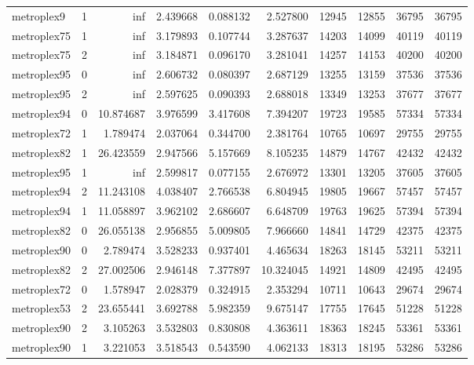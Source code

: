 \begin{longtable}{|l|r|r|r|r|r|r|r|r|r|}
metroplex9 & 1 & inf & 2.439668 & 0.088132 & 2.527800 & 12945 & 12855 & 36795 & 36795 \\
metroplex75 & 1 & inf & 3.179893 & 0.107744 & 3.287637 & 14203 & 14099 & 40119 & 40119 \\
metroplex75 & 2 & inf & 3.184871 & 0.096170 & 3.281041 & 14257 & 14153 & 40200 & 40200 \\
metroplex95 & 0 & inf & 2.606732 & 0.080397 & 2.687129 & 13255 & 13159 & 37536 & 37536 \\
metroplex95 & 2 & inf & 2.597625 & 0.090393 & 2.688018 & 13349 & 13253 & 37677 & 37677 \\
metroplex94 & 0 & 10.874687 & 3.976599 & 3.417608 & 7.394207 & 19723 & 19585 & 57334 & 57334 \\
metroplex72 & 1 & 1.789474 & 2.037064 & 0.344700 & 2.381764 & 10765 & 10697 & 29755 & 29755 \\
metroplex82 & 1 & 26.423559 & 2.947566 & 5.157669 & 8.105235 & 14879 & 14767 & 42432 & 42432 \\
metroplex95 & 1 & inf & 2.599817 & 0.077155 & 2.676972 & 13301 & 13205 & 37605 & 37605 \\
metroplex94 & 2 & 11.243108 & 4.038407 & 2.766538 & 6.804945 & 19805 & 19667 & 57457 & 57457 \\
metroplex94 & 1 & 11.058897 & 3.962102 & 2.686607 & 6.648709 & 19763 & 19625 & 57394 & 57394 \\
metroplex82 & 0 & 26.055138 & 2.956855 & 5.009805 & 7.966660 & 14841 & 14729 & 42375 & 42375 \\
metroplex90 & 0 & 2.789474 & 3.528233 & 0.937401 & 4.465634 & 18263 & 18145 & 53211 & 53211 \\
metroplex82 & 2 & 27.002506 & 2.946148 & 7.377897 & 10.324045 & 14921 & 14809 & 42495 & 42495 \\
metroplex72 & 0 & 1.578947 & 2.028379 & 0.324915 & 2.353294 & 10711 & 10643 & 29674 & 29674 \\
metroplex53 & 2 & 23.655441 & 3.692788 & 5.982359 & 9.675147 & 17755 & 17645 & 51228 & 51228 \\
metroplex90 & 2 & 3.105263 & 3.532803 & 0.830808 & 4.363611 & 18363 & 18245 & 53361 & 53361 \\
metroplex90 & 1 & 3.221053 & 3.518543 & 0.543590 & 4.062133 & 18313 & 18195 & 53286 & 53286 \\
\end{longtable}

